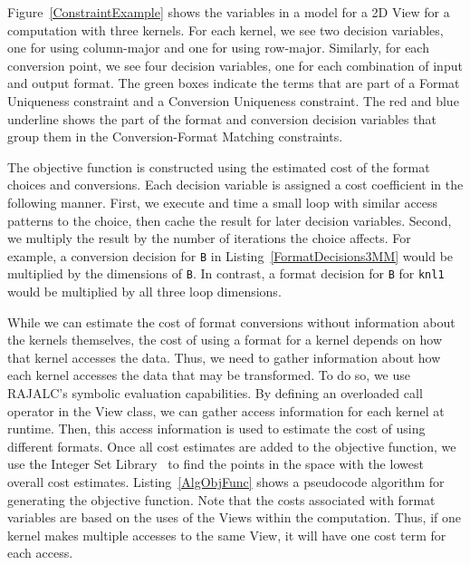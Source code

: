 \documentclass[sigconf,review=true]{acmart}
\begin{document}
Figure~\ref{ConstraintExample} shows the variables in a model for a 2D View for a computation with three kernels. 
For each kernel, we see two decision variables, one for using column-major and one for using row-major. 
Similarly, for each conversion point, we see four decision variables, one for each combination of input and output format. 
The green boxes indicate the terms that are part of a Format Uniqueness constraint and a Conversion Uniqueness constraint.
The red and blue underline shows the part of the format and conversion decision variables that group them in the Conversion-Format Matching constraints. 

The objective function is constructed using the estimated cost of the format choices and conversions. 
Each decision variable is assigned a cost coefficient in the following manner.
First, we execute and time a small loop with similar access patterns to the choice, then cache the result for later decision variables.
Second, we multiply the result by the number of iterations the choice affects.
For example, a conversion decision for \verb.B. in Listing~\ref{FormatDecisions3MM} would be multiplied by the dimensions of \verb.B..
In contrast, a format decision for \verb.B. for \verb.knl1. would be multiplied by all three loop dimensions. 

While we can estimate the cost of format conversions without information about the kernels themselves, the cost of using a format for a kernel depends on how that kernel accesses the data.
Thus, we need to gather information about how each kernel accesses the data that may be transformed. 
To do so, we use RAJALC's symbolic evaluation capabilities. 
By defining an overloaded call operator in the View class, we can gather access information for each kernel at runtime. 
Then, this access information is used to estimate the cost of using different formats. 
Once all cost estimates are added to the objective function, we use the Integer Set Library~\cite{verdoolaege2010isl} to find the points in the space with the lowest overall cost estimates. 
Listing~\ref{AlgObjFunc} shows a pseudocode algorithm for generating the objective function.
Note that the costs associated with format variables are based on the uses of the Views within the computation. 
Thus, if one kernel makes multiple accesses to the same View, it will have one cost term for each access.
\end{document}
